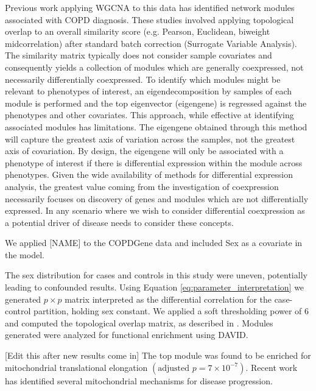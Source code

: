 Previous work applying WGCNA to this data has identified network modules
associated with COPD diagnosis\cite{morrow2015identifying,morrow2017functional}.
These studies involved applying topological overlap to an overall
similarity score (e.g. Pearson, Euclidean, biweight midcorrelation)
after standard batch correction (Surrogate Variable Analysis\cite{leek2007capturing}).
The similarity matrix typically does not consider sample covariates
and consequently yields a collection of modules which are generally
coexpressed, not necessarily differentially coexpressed. To identify
which modules might be relevant to phenotypes of interest, an eigendecomposition
by samples of each module is performed and the top eigenvector (eigengene)
is regressed against the phenotypes and other covariates. This approach,
while effective at identifying associated modules has limitations.
The eigengene obtained through this method will capture the greatest
axis of variation across the samples, not the greatest axis of covariation.
By design, the eigengene will only be associated with a phenotype
of interest if there is differential expression within the module
across phenotypes. Given the wide availability of methods for differential
expression analysis, the greatest value coming from the investigation
of coexpression necessarily focuses on discovery of genes and modules
which are not differentially expressed. In any scenario where we wish
to consider differential coexpression as a potential driver of disease
needs to consider these concepts.

We applied {[}NAME{]} to the COPDGene data and included Sex as a covariate
in the model. 

The sex distribution for cases and controls in this study were uneven,
potentially leading to confounded results. Using Equation \ref{eq:parameter_interpretation}
we generated $p\times p$ matrix interpreted as the differential correlation
for the case-control partition, holding sex constant. We applied a
soft thresholding power of 6 and computed the topological overlap
matrix, as described in \cite{wgcna1}. Modules generated were analyzed
for functional enrichment using DAVID\cite{huang2009bioinformatics,huang2009systematic}. 

{[}Edit this after new results come in{]} The top module was found
to be enriched for mitochondrial translational elongation $\left(\text{adjusted }p=7\times10^{-7}\right)$.
Recent work has identified several mitochondrial mechanisms for disease
progression\cite{cloonan2016mitochondrial,cloonan2016mitochondria}.

